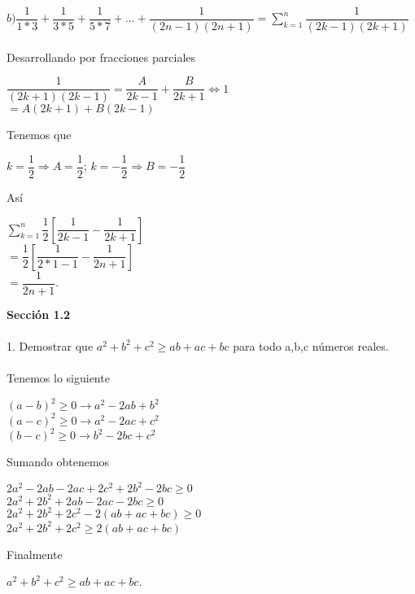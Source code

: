 \documentclass[12pt,a4paper,scrartcl]{article}
\begin{document}
{\vspace{1em}
$\displaystyle b)\dfrac{1}{1*3}+\dfrac{1}{3*5}+\dfrac{1}{5*7}+\ldots+\dfrac{1}{(2n-1)(2n+1)} =\sum_{k=1}^{n}\dfrac{1}{(2k-1)(2k+1)}$\\
\\
Desarrollando por fracciones parciales\\\vspace{1em}
\begin{center}
$\dfrac{1}{(2k+1)(2k-1)}=\dfrac{A}{2k-1}+\dfrac{B}{2k+1}\Leftrightarrow 1$\\\vspace{1em}
$=A(2k+1)+B(2k-1)$\\\vspace{1em}
\end{center}
Tenemos que \\
\begin{center}
$k=\dfrac{1}{2}\Rightarrow A=\dfrac{1}{2}$;\hspace{1em} $k=-\dfrac{1}{2}\Rightarrow B=-\dfrac{1}{2}$\\\vspace{1em}
\end{center}
As\'i
\begin{center}
$\displaystyle
\sum_{k=1}^{n}\dfrac{1}{2}[\dfrac{1}{2k-1}-\dfrac{1}{2k+1}]$\\\vspace{1em}
$=\dfrac{1}{2}[\dfrac{1}{2*1-1}-\dfrac{1}{2n+1}]$\\\vspace{1em}
$=\dfrac{1}{2n+1}$.
\end{center}





\newpage
\textbf{Secci\'on 1.2}\\
\\1. Demostrar que $a^2+b^2+c^2\geq ab+ac+bc$ para todo a,b,c n\'umeros reales.\\
\\Tenemos lo siguiente\\
\begin{center}
$ (a-b)^2 \geq 0 \rightarrow a^2-2ab+b^2$\\
$ (a-c)^2 \geq 0 \rightarrow a^2-2ac+c^2$\\
$ (b-c)^2 \geq 0 \rightarrow b^2-2bc+c^2$\\
\end{center}
Sumando obtenemos\\
\begin{center}
$2a^2-2ab-2ac+2c^2+2b^2-2bc \geq 0$\\
$2a^2+2b^2+2ab-2ac-2bc \geq 0 $\\
$2a^2+2b^2+2c^2-2(ab+ac+bc) \geq 0 $\\
$2a^2+2b^2+2c^2 \geq 2(ab+ac+bc)$\\
\end{center}
Finalmente\\
\begin{center}
$ a^2+b^2+c^2 \geq ab+ac+bc$.
\end{center}




}
\end{document}
